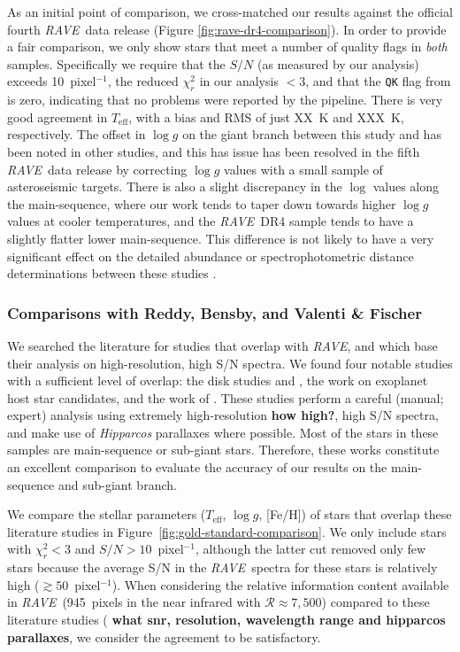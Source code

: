 \documentclass[preprint,trackchanges]{aastex}
\newcommand{\acronym}[1]{{\small{#1}}}
\newcommand{\project}[1]{\textsl{#1}}
\newcommand{\rave}{\project{\acronym{RAVE}}}
\newcommand{\stub}[1]{{\color{blue} \textbf{#1}}}
\newcommand{\teff}{T_{\mathrm{eff}}}
\newcommand{\logg}{\log g}
\begin{document}
As an initial point of comparison, we cross-matched our results against the 
official fourth \rave\ data release (Figure \ref{fig:rave-dr4-comparison}).
In order to provide a fair comparison, we only show stars that meet a number
of quality flags in \emph{both} samples. Specifically we require that the 
$S/N$ (as measured by our analysis) exceeds 10~pixel$^{-1}$, the reduced
$\chi_r^2$ in our analysis $< 3$, and that the \texttt{QK} flag from
\citet{Kordopatis_2013} is zero, indicating that no problems were reported by the pipeline.
There is very good agreement in $\teff$, with a bias and RMS of just XX~K 
and XXX~K, respectively.  The offset in $\logg$ on the giant branch between this study and 
\citet{Kordopatis_2013} has been noted in other studies, and this has issue
has been resolved in the fifth \rave\ data release by correcting $\logg$
values with a small sample of asteroseismic targets.  There is also a
slight discrepancy in the $\log$ values along the main-sequence, where our
work tends to taper down towards higher $\logg$ values at cooler temperatures,
and the \rave\ DR4 sample tends to have a slightly flatter lower main-sequence.
This difference is not likely to have a very significant effect on the detailed
abundance or spectrophotometric distance determinations between these studies 
\citep{Binney_2014}.


\subsubsection{Comparisons with Reddy, Bensby, and Valenti \& Fischer}
\label{sec:validation-gold-standards}

We searched the literature for studies that overlap with \rave, and which base
their analysis on high-resolution, high S/N spectra.  We found four notable
studies with a sufficient level of overlap: the disk studies \citet{Reddy_2003}
and \citet{Reddy_2006}, the \citet{Valenti_Fischer_2005} work on exoplanet
host star candidates, and the work of \citet{Bensby_2014}.  These studies 
perform a careful (manual; expert) analysis using extremely high-resolution
\stub{how high?}, high S/N spectra, and make use of \project{Hipparcos}
parallaxes where possible.  Most of the stars in these samples are main-sequence
or sub-giant stars.  Therefore, these works constitute an excellent comparison
to evaluate the accuracy of our results on the main-sequence and sub-giant branch.


We compare the stellar parameters ($\teff$, $\logg$, [Fe/H]) of stars that
overlap these literature studies in Figure~\ref{fig:gold-standard-comparison}.
We only include stars with $\chi_r^2 < 3$ and $S/N > 10$~pixel$^{-1}$, although the latter
cut removed only few stars because the average S/N in the \rave\ spectra for
these stars is relatively high ($\gtrsim{}50$~pixel$^{-1}$). When considering the relative 
information content available in \rave\ (945~pixels in the near infrared with
$\mathcal{R} \approx 7{,}500$) compared to these literature studies (\stub{what snr, resolution, wavelength range and hipparcos parallaxes}, we consider the
 agreement to be satisfactory.
\end{document}
